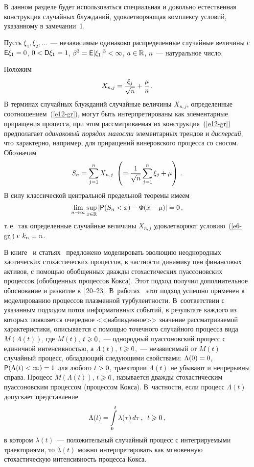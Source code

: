 \begin{multicols}{2}
В данном разделе будет использоваться специальная и довольно
естественная конструкция случайных блужданий, удовлетворяющая
комплексу условий, указанному в замечании~1.

Пусть $\xi_1,\xi_2,\ldots$~--- независимые одинаково распределенные
случайные величины с ${\sf E}\xi_1\hm=0$, $0\hm<{\sf D}\xi_1\hm=1$,
$\beta^3\hm={\sf E}|\xi_1|^3\hm<\infty$, $a\hm\in\r$, $n$~--- натуральное число.

Положим
\begin{equation}
X_{n,j}=\displaystyle\frac{\displaystyle \xi_j\mathstrut}{\displaystyle \sqrt{n}\mathstrut}+\displaystyle\frac{\displaystyle \mu\mathstrut}{\displaystyle n\mathstrut}\,.\label{e12-gr}
\end{equation}
В терминах случайных блужданий случайные величины $X_{n,j}$,
определенные соотношением~(\ref{e12-gr}), могут быть интерпретированы как
элементарные приращения процесса, при этом рассматриваемая их
конструкция~(\ref{e12-gr}) предполагает \textit{одинаковый порядок малости}
элементарных трендов и \textit{дисперсий}, что характерно, например,
для приращений винеровского процесса со сносом. Обозначим
$$
S_n=\sum_{j=1}^n X_{n,j}\
\left(=\displaystyle\frac{\displaystyle 1\mathstrut}{\displaystyle \sqrt{n}\mathstrut}\sum\limits_{j=1}^n\xi_j+\mu\right)\,.
$$
В силу классической центральной предельной теоремы имеем
$$
\lim_{n\to\infty}\sup\limits_{x\in\mathbb{R}}\left\vert {\sf P}(S_n<x)-\Phi(x-\mu)\right\vert=0\,,
$$
т.\,е.\ так определенные случайные величины $X_{n,j}$ удовлетворяют
условию~(\ref{e6-gr}) с $k_n\hm=n$.

В книге~\cite{GnedenkoKorolev1996} и статьях~\cite{Korolev1997, Korolev2000} 
предложено моделировать эволюцию неоднородных хаотических стохастических 
процессов, в частности динамику цен финансовых активов, с помощью обобщенных 
дважды стохастических пуассоновских процессов (обобщенных процессов Кокса). 
Этот подход получил дополнительное обоснование и развитие в~[20--23]. 
В~работах~\cite{Korolev2011, KorolevSkvortsova2006} этот подход успешно применен к 
моделированию процессов плазменной турбулентности. В~соответствии с указанным 
подходом поток информативных событий, в результате каждого из которых 
появляется очередное <<наблюденное>> значение рассматриваемой характеристики, 
описывается с помощью точечного случайного процесса вида $M(\Lambda(t))$, где 
$M(t)$, $t\hm\geqslant 0$,~--- однородный пуассоновский процесс с единичной 
интенсивностью, а $\Lambda(t)$, $t\hm\geqslant 0$,~--- независимый от $M(t)$ 
случайный процесс, обладающий следующими свойствами: $\Lambda(0)\hm=0$, 
${\sf  P}(\Lambda(t)\hm<\infty)\hm=1$ для любого $t\hm>0$, траектории $\Lambda(t)$ 
не убывают и  непрерывны справа. Процесс $M(\Lambda(t))$, $t\hm\geqslant 0$, называется дважды 
стохастическим пуассоновским процессом (процессом Кокса). В~частности, если 
процесс $\Lambda(t)$ допускает представление
$$
\Lambda(t)=\int\limits_{0}^{t}\lambda(\tau)\,d\tau\,,\enskip t\geqslant0\,,
$$
в котором $\lambda(t)$~--- положительный случайный процесс с
интегрируемыми траекториями, то $\lambda(t)$ можно интерпретировать
как мгновенную стохастическую интенсивность процесса Кокса.


\end{multicols}
